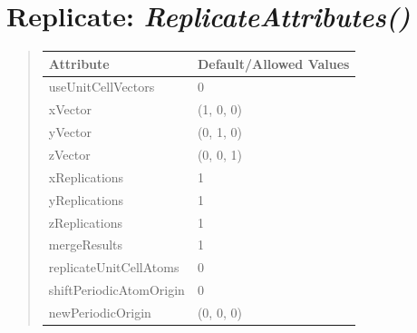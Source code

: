 \documentclass[letterpaper,10pt,english]{sphinxmanual}
\begin{document}
\section{\textbf{Replicate}: \emph{ReplicateAttributes()}}
\label{attributes:replicate-replicateattributes}
\begin{DUlineblock}{0em}
\item[] 
\end{DUlineblock}
\begin{quote}

\begin{tabulary}{\linewidth}{|L|L|}
\hline

\textbf{Attribute}
 & 
\textbf{Default/Allowed Values}
\\
\hline
useUnitCellVectors
 & 
0
\\
\hline
xVector
 & 
(1, 0, 0)
\\
\hline
yVector
 & 
(0, 1, 0)
\\
\hline
zVector
 & 
(0, 0, 1)
\\
\hline
xReplications
 & 
1
\\
\hline
yReplications
 & 
1
\\
\hline
zReplications
 & 
1
\\
\hline
mergeResults
 & 
1
\\
\hline
replicateUnitCellAtoms
 & 
0
\\
\hline
shiftPeriodicAtomOrigin
 & 
0
\\
\hline
newPeriodicOrigin
 & 
(0, 0, 0)
\\
\hline\end{tabulary}

\end{quote}

\begin{DUlineblock}{0em}
\item[] 
\end{DUlineblock}

\begin{DUlineblock}{0em}
\item[] 
\end{DUlineblock}
\end{document}
